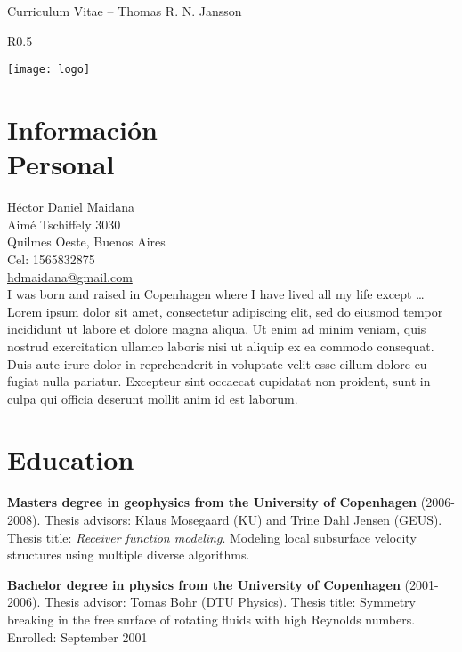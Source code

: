 \documentclass[margin, line, a4paper]{resume}
\begin{document}
{\sc \Large Curriculum Vitae -- Thomas R. N. Jansson}
\begin{resume}
    \vspace{0.5cm}
    \begin{wrapfigure}{R}{0.5\textwidth}
        \vspace{-1cm}
       \begin{center}
       \texttt{[image: logo]}
       \end{center}
        \vspace{-1cm}
    \end{wrapfigure}
    


    \section{\mysidestyle Información\\Personal}
    Héctor Daniel Maidana \\
    Aimé Tschiffely 3030 \\ 
    Quilmes Oeste, Buenos Aires \\ 
    Cel: 1565832875 \\
    \href{mailto:hdmaidana@gmail.com}{hdmaidana@gmail.com} \\

    I was born and raised in Copenhagen where I have liv\-ed all my life except \ldots{}
Lorem ipsum dolor sit amet, consectetur adipiscing elit, sed do eiusmod tempor incididunt ut labore et dolore magna aliqua. Ut enim ad minim veniam, quis nostrud exercitation ullamco laboris nisi ut aliquip ex ea commodo consequat. Duis aute irure dolor in reprehenderit in voluptate velit esse cillum dolore eu fugiat nulla pariatur. Excepteur sint occaecat cupidatat non proident, sunt in culpa qui officia deserunt mollit anim id est laborum.

    \section{\mysidestyle Education} 
    
    \textbf{Masters degree in geophysics from
    the University of Copenhagen} (2006-2008). Thesis advisors: Klaus Mosegaard
    (KU) and Trine Dahl Jensen (GEUS).  Thesis title: \textit{Receiver function
    modeling}. Modeling local subsurface velocity structures using multiple
    diverse algorithms.

    \textbf{Bachelor degree in physics from the University of Copenhagen}
    (2001-2006).  Thesis advisor: Tomas Bohr (DTU Physics).
    Thesis title: Symmetry breaking in the free surface of rotating fluids
    with high Reynolds numbers.  Enrolled: September 2001


\end{resume}
\end{document}
